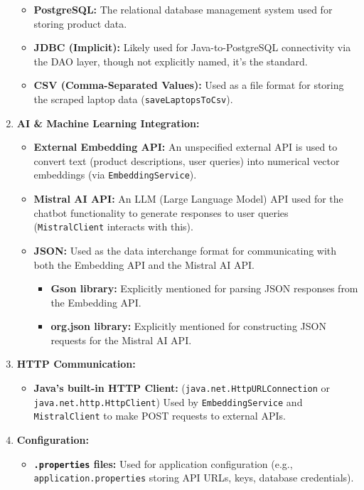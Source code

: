 \documentclass{article}
\begin{document}
\begin{enumerate}
    \begin{itemize}
        \item \textbf{PostgreSQL:} The relational database management system used for storing product data.
        \item \textbf{JDBC (Implicit):} Likely used for Java-to-PostgreSQL connectivity via the DAO layer, though not explicitly named, it's the standard.
        \item \textbf{CSV (Comma-Separated Values):} Used as a file format for storing the scraped laptop data (\texttt{saveLaptopsToCsv}).
    \end{itemize}
    \item \textbf{AI \& Machine Learning Integration:}
    \begin{itemize}
        \item \textbf{External Embedding API:} An unspecified external API is used to convert text (product descriptions, user queries) into numerical vector embeddings (via \texttt{EmbeddingService}).
        \item \textbf{Mistral AI API:} An LLM (Large Language Model) API used for the chatbot functionality to generate responses to user queries (\texttt{MistralClient} interacts with this).
        \item \textbf{JSON:} Used as the data interchange format for communicating with both the Embedding API and the Mistral AI API.
        \begin{itemize}
            \item \textbf{Gson library:} Explicitly mentioned for parsing JSON responses from the Embedding API.
            \item \textbf{org.json library:} Explicitly mentioned for constructing JSON requests for the Mistral AI API.
        \end{itemize}
    \end{itemize}
    \item \textbf{HTTP Communication:}
    \begin{itemize}
        \item \textbf{Java's built-in HTTP Client:} (\texttt{java.net.HttpURLConnection} or \texttt{java.net.http.HttpClient}) Used by \texttt{EmbeddingService} and \texttt{MistralClient} to make POST requests to external APIs.
    \end{itemize}
    \item \textbf{Configuration:}
    \begin{itemize}
        \item \textbf{\texttt{.properties} files:} Used for application configuration (e.g., \texttt{application.properties} storing API URLs, keys, database credentials).

\end{itemize}
\end{enumerate}
\end{document}
